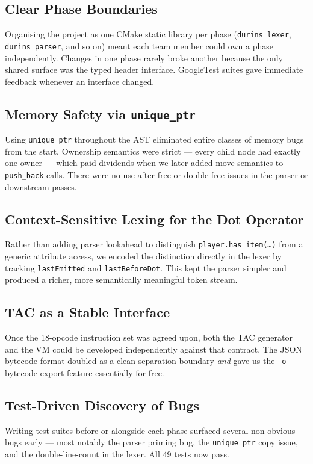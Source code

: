 \documentclass[12pt, a4paper]{article}
\begin{document}
\subsection{Clear Phase Boundaries}
Organising the project as one CMake static library per phase
(\texttt{durins\_lexer}, \texttt{durins\_parser}, and so on) meant each team member
could own a phase independently.
Changes in one phase rarely broke another because the only shared surface was the
typed header interface.
GoogleTest suites gave immediate feedback whenever an interface changed.

\subsection{Memory Safety via \texttt{unique\_ptr}}
Using \texttt{unique\_ptr} throughout the AST eliminated entire classes of memory
bugs from the start.
Ownership semantics were strict --- every child node had exactly one owner --- which
paid dividends when we later added move semantics to \texttt{push\_back} calls.
There were no use-after-free or double-free issues in the parser or downstream passes.

\subsection{Context-Sensitive Lexing for the Dot Operator}
Rather than adding parser lookahead to distinguish \texttt{player.has\_item(\ldots)}
from a generic attribute access, we encoded the distinction directly in the lexer by
tracking \texttt{lastEmitted} and \texttt{lastBeforeDot}.
This kept the parser simpler and produced a richer, more semantically meaningful
token stream.

\subsection{TAC as a Stable Interface}
Once the 18-opcode instruction set was agreed upon, both the TAC generator and the VM
could be developed independently against that contract.
The JSON bytecode format doubled as a clean separation boundary \emph{and} gave us
the \texttt{-o} bytecode-export feature essentially for free.

\subsection{Test-Driven Discovery of Bugs}
Writing test suites before or alongside each phase surfaced several non-obvious bugs
early --- most notably the parser priming bug, the \texttt{unique\_ptr} copy issue,
and the double-line-count in the lexer.
All 49 tests now pass.
\end{document}
